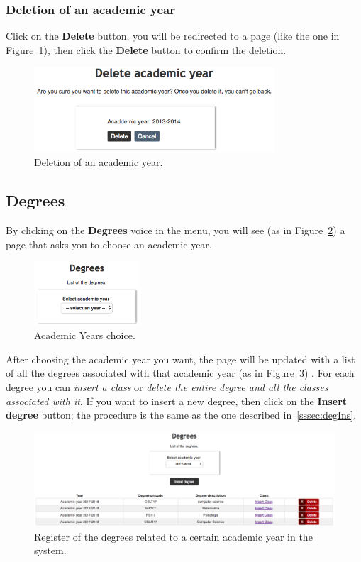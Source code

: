 \subsubsection{Deletion of an academic year}
Click on the \textbf{Delete} button, you will be redirected to a page (like the one in Figure~\ref{fig:deleteAcademicYear}), then click the \textbf{Delete} button to confirm the deletion.
\begin{figure}[H]
  \centering
  \includegraphics[width=0.80\textwidth]{img/deleteAcademicYear.png}
  \caption{Deletion of an academic year.}
  \label{fig:deleteAcademicYear}
\end{figure}

\subsection{Degrees}
By clicking on the \textbf{Degrees} voice in the menu, you will see (as in Figure~\ref{fig:chooseYear}) a page that asks you to choose an academic year. 
\begin{figure}[H]
	\centering
	\includegraphics[width=0.35\textwidth]{img/chooseYear.png}
	\caption{Academic Years choice.}
	\label{fig:chooseYear}
\end{figure}

After choosing the academic year you want, the page will be updated with a list of all the degrees associated with that academic year (as in Figure~\ref{fig:degreeCourses}) . For each degree you can \emph{insert a class}  or \emph{delete the entire degree and all the classes associated with it}. If you want to insert a new degree, then click on the \textbf{Insert degree} button; the procedure is the same as the one described in~\ref{sssec:degIns}.
\begin{figure}[!h]
  \centering
  \includegraphics[width=1.0\textwidth]{img/degreeCourses.png}
  \caption{Register of the degrees related to a certain academic year in the system.}
  \label{fig:degreeCourses}
\end{figure}

